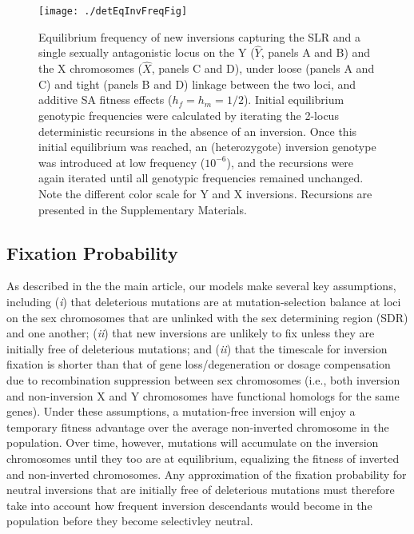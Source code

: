 \documentclass[11pt]{article}
\begin{document}


 \begin{figure}[!htbp]
 \centering
 \texttt{[image: ./detEqInvFreqFig]}
 \caption{Equilibrium frequency of new inversions capturing the SLR and a single sexually antagonistic locus on the Y ($\hat{Y}$, panels A and B) and the X chromosomes ($\hat{X}$, panels C and D), under loose (panels A and C) and tight (panels B and D) linkage between the two loci, and additive SA fitness effects ($h_f = h_m = 1/2$). Initial equilibrium genotypic frequencies were calculated by iterating the 2-locus deterministic recursions in the absence of an inversion. Once this initial equilibrium was reached, an (heterozygote) inversion genotype was introduced at low frequency ($10^{-6}$), and the recursions were again iterated until all genotypic frequencies remained unchanged. Note the different color scale for Y and X inversions. Recursions are presented in the Supplementary Materials.}
 \label{fig:detInvFreqSA}
 \end{figure}






\subsection{Fixation Probability}

As described in the the main article, our models make several key assumptions, including ({\itshape i}) that deleterious mutations are at mutation-selection balance at loci on the sex chromosomes that are unlinked with the sex determining region (SDR) and one another; ({\itshape ii}) that new inversions are unlikely to fix unless they are initially free of deleterious mutations; and ({\itshape ii}) that the timescale for inversion fixation is shorter than that of gene loss/degeneration or dosage compensation due to recombination suppression between sex chromosomes (i.e., both inversion and non-inversion X and Y chromosomes have functional homologs for the same genes). Under these assumptions, a mutation-free inversion will enjoy a temporary fitness advantage over the average non-inverted chromosome in the population. Over time, however, mutations will accumulate on the inversion chromosomes until they too are at equilibrium, equalizing the fitness of inverted and non-inverted chromosomes. Any approximation of the fixation probability for neutral inversions that are initially free of deleterious mutations must therefore take into account how frequent inversion descendants would become in the population before they become selectivley neutral.
\end{document}
